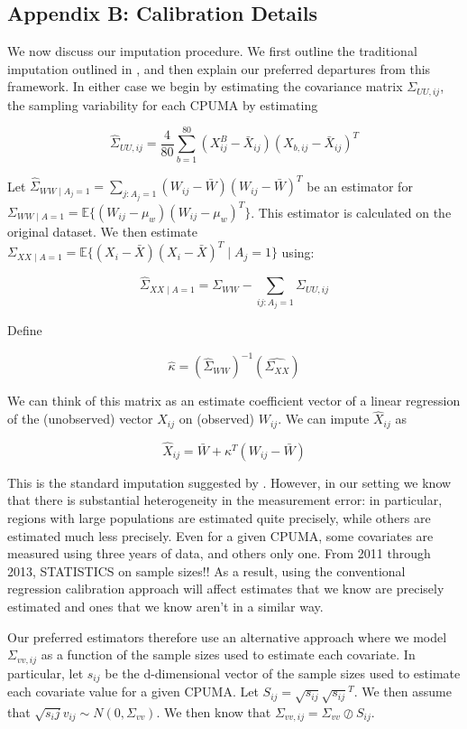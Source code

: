 \documentclass[12pt]{article}
\begin{document}
\subsection{Appendix B: Calibration Details}

We now discuss our imputation procedure. We first outline the traditional imputation outlined in \cite{carroll2006measurement}, and then explain our preferred departures from this framework. In either case we begin by estimating the covariance matrix $\Sigma_{UU, ij}$, the sampling variability for each CPUMA by estimating

$$
\hat{\Sigma}_{UU, ij} = \frac{4}{80}\sum_{b=1}^{80}(X_{ij}^B - \bar{X}_{ij})(X_{b, ij} - \bar{X}_{ij})^T
$$

Let $\hat{\Sigma}_{WW \mid A_j = 1} = \sum_{j: A_j = 1} (W_{ij} - \bar{W})(W_{ij} - \bar{W})^T$ be an estimator for $\Sigma_{WW \mid A = 1} = \mathbb{E}\{(W_{ij} - \mu_w)(W_{ij} - \mu_w)^T\}$. This estimator is calculated on the original dataset. We then estimate $\Sigma_{XX \mid A = 1} = \mathbb{E}\{(X_i - \bar{X})(X_i - \bar{X})^T \mid A_j = 1\}$ using:

$$
\hat{\Sigma}_{XX \mid A = 1} = \Sigma_{WW} - \sum_{ij: A_j = 1} \Sigma_{UU, ij}
$$

Define

$$
\hat{\kappa} = (\hat{\Sigma}_{WW})^{-1}(\hat{\Sigma_{XX}})
$$

We can think of this matrix as an estimate coefficient vector of a linear regression of the (unobserved) vector $X_{ij}$ on (observed) $W_{ij}$. We can impute $\hat{X}_{ij}$ as

$$
\hat{X}_{ij} = \bar{W} + \kappa^T(W_{ij} - \bar{W})
$$

This is the standard imputation suggested by \cite{carroll2006measurement}. However, in our setting we know that there is substantial heterogeneity in the measurement error: in particular, regions with large populations are estimated quite precisely, while others are estimated much less precisely. Even for a given CPUMA, some covariates are measured using three years of data, and others only one. From 2011 through 2013, STATISTICS on sample sizes!! As a result, using the conventional regression calibration approach will affect estimates that we know are precisely estimated and ones that we know aren't in a similar way. 

Our preferred estimators therefore use an alternative approach where we model $\Sigma_{vv, ij}$ as a function of the sample sizes used to estimate each covariate. In particular, let $s_{ij}$ be the d-dimensional vector of the sample sizes used to estimate each covariate value for a given CPUMA. Let $S_{ij} = \sqrt{s_{ij}}\sqrt{s_{ij}}^T$. We then assume that $\sqrt{s_ij}v_{ij} \sim N(0, \Sigma_{vv})$. We then know that $\Sigma_{vv, ij} = \Sigma_{vv} \oslash S_{ij}$. 
\end{document}
